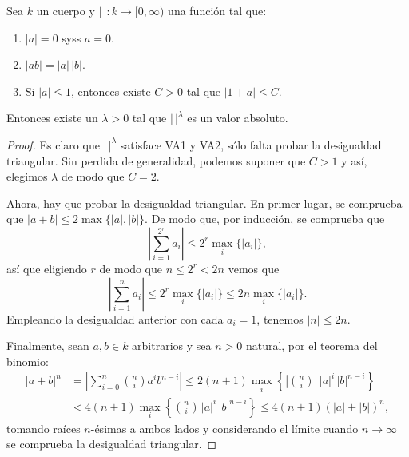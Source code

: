 \documentclass[teoria-numeros.tex]{subfiles}
\begin{document}
\begin{lem}
	Sea $k$ un cuerpo y $|\,|\colon k \to [0, \infty)$ una función tal que:
	\begin{enumerate}
		\item $|a| = 0$ syss $a = 0$.
		\item $|ab| = |a| \, |b|$.
		\item Si $|a| \le 1$, entonces existe $C > 0$ tal que $|1 + a| \le C$.
	\end{enumerate}
	Entonces existe un $\lambda > 0$ tal que $|\,|^\lambda$ es un valor absoluto.
\end{lem}
\begin{proof}
	Es claro que $|\,|^\lambda$ satisface VA1 y VA2, sólo falta probar la desigualdad triangular.
	Sin perdida de generalidad, podemos suponer que $C > 1$ y así, elegimos $\lambda$ de modo que $C = 2$.

	Ahora, hay que probar la desigualdad triangular.
	En primer lugar, se comprueba que $|a + b| \le 2\max\{ |a|, |b| \}$.
	De modo que, por inducción, se comprueba que
	$$ \left| \sum_{i=1}^{2^r} a_i \right| \le 2^r \max_i\{ |a_i| \}, $$
	así que eligiendo $r$ de modo que $n \le 2^r < 2n$ vemos que
	$$ \left| \sum_{i=1}^{n} a_i \right| \le 2^r \max_i\{ |a_i| \} \le 2n\max_i \{ |a_i| \}. $$
	Empleando la desigualdad anterior con cada $a_i = 1$, tenemos $|n| \le 2n$.

	Finalmente, sean $a, b \in k$ arbitrarios y sea $n > 0$ natural, por el teorema del binomio:
	\begin{align*}
		|a + b|^n &= \left| \sum_{i=0}^{n} \binom{n}{i} a^i b^{n-i} \right|
		\le 2(n+1) \max_i \left\{ {\textstyle \left| \binom{n}{i} \right| } \, |a|^i \, |b|^{n-i} \right\} \\
			  &< 4(n+1) \max_i \left\{ {\textstyle \binom{n}{i}} \, |a|^i \, |b|^{n-i} \right\} \le 4(n+1) (|a| + |b|)^n,
	\end{align*}
	tomando raíces $n$-ésimas a ambos lados y considerando el límite cuando $n \to \infty$ se comprueba la desigualdad triangular.
\end{proof}
\end{document}
